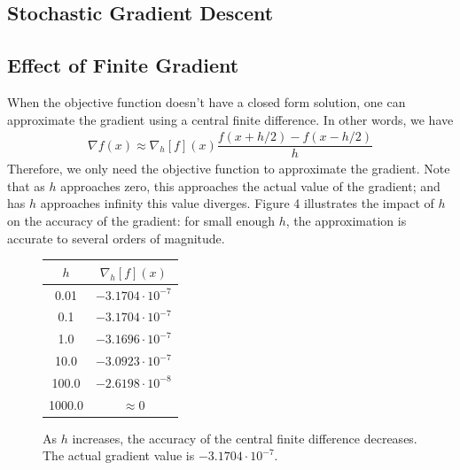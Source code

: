 \documentclass{paper}
\begin{document}
\subsection{Stochastic Gradient Descent}



\subsection{Effect of Finite Gradient}

When the objective function doesn't have a closed form solution, one can approximate the gradient using a central finite difference. In other words, we have 
\begin{align*}
\nabla f(x) \approx \nabla_h[f](x) \dfrac{f(x+h/2) - f(x-h/2)}{h}
\end{align*}
Therefore, we only need the objective function to approximate the gradient. Note that as $h$ approaches zero, this approaches the actual value of the gradient; and has $h$ approaches infinity this value diverges. Figure 4 illustrates the impact of $h$ on the accuracy of the gradient: for small enough $h$, the approximation is accurate to several orders of magnitude.

\begin{figure}[ht!]
  \centering
    \begin{tabular}{c | c}
    $h$  & $\nabla_h[f](x)$ \\	\hline
	0.01 & $-3.1704 \cdot 10^{-7}$ \\
	0.1 & $-3.1704 \cdot 10^{-7}$ \\
	1.0 & $-3.1696 \cdot 10^{-7}$ \\
	10.0 & $-3.0923 \cdot 10^{-7}$ \\
	100.0 & $-2.6198 \cdot 10^{-8}$ \\
	1000.0 & $\approx 0$ \\
    \end{tabular}
  \caption{As $h$ increases, the accuracy of the central finite difference decreases. The actual gradient value is $-3.1704 \cdot 10^{-7}$.}
\end{figure}
\end{document}
